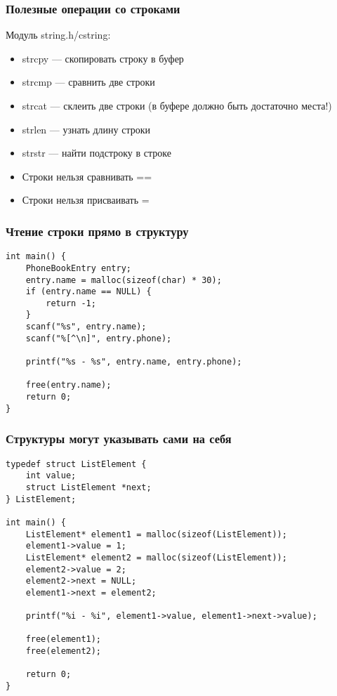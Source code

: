 \documentclass[xetex,mathserif,serif]{beamer}
\begin{document}
    \begin{frame}
        \frametitle{Полезные операции со строками}
        Модуль string.h/cstring:
        \begin{itemize}
            \item strcpy --- скопировать строку в буфер
            \item strcmp --- сравнить две строки
            \item strcat --- склеить две строки (в буфере должно быть достаточно места!)
            \item strlen --- узнать длину строки
            \item strstr --- найти подстроку в строке
            \item Строки нельзя сравнивать ==
            \item Строки нельзя присваивать =
        \end{itemize}
    \end{frame}

    \begin{frame}[fragile]
        \frametitle{Чтение строки прямо в структуру}
        \begin{verbatim}
int main() {
    PhoneBookEntry entry;
    entry.name = malloc(sizeof(char) * 30);
    if (entry.name == NULL) {
        return -1;
    }
    scanf("%s", entry.name);
    scanf("%[^\n]", entry.phone);

    printf("%s - %s", entry.name, entry.phone);

    free(entry.name);
    return 0;
}
        \end{verbatim}
    \end{frame}

    \begin{frame}[fragile]
        \frametitle{Структуры могут указывать сами на себя}
        \begin{footnotesize}
            \begin{verbatim}
typedef struct ListElement {
    int value;
    struct ListElement *next;
} ListElement;

int main() {
    ListElement* element1 = malloc(sizeof(ListElement));
    element1->value = 1;
    ListElement* element2 = malloc(sizeof(ListElement));
    element2->value = 2;
    element2->next = NULL;
    element1->next = element2;

    printf("%i - %i", element1->value, element1->next->value);

    free(element1);
    free(element2);

    return 0;
}
            \end{verbatim}
        \end{footnotesize}
    \end{frame}
\end{document}
